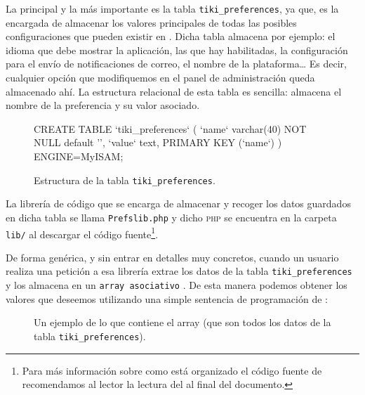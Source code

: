 La principal y la más importante es la tabla \texttt{tiki\_preferences}, ya que, es la encargada de almacenar los valores principales de todas las posibles configuraciones que pueden existir en \tiki{}. Dicha tabla almacena por ejemplo: el idioma que debe mostrar la aplicación, las  que hay habilitadas, la configuración para el envío de notificaciones de correo, el nombre de la plataforma\ldots{} Es decir, cualquier opción que modifiquemos en el panel de administración queda almacenado ahí.  
La estructura relacional de esta tabla es sencilla: almacena el nombre de la preferencia y su valor asociado.

\begin{figure}[h!]
\begin{pyglist}[language=sql]

  CREATE TABLE `tiki_preferences` (
    `name` varchar(40) NOT NULL default '',
    `value` text,
    PRIMARY KEY (`name`)
  ) ENGINE=MyISAM;
  
\end{pyglist}
\caption{Estructura de la tabla \texttt{tiki\_preferences}.}
\end{figure}
  
La librería de código que se encarga de almacenar y recoger los datos guardados en dicha tabla se llama \texttt{Prefslib.php} y dicho \textsc{php} se encuentra en la carpeta \texttt{lib/} al descargar el código fuente\footnote{Para más información sobre como está organizado el código fuente de \tiki{} recomendamos al lector la lectura del  al final del documento.}.

De forma genérica, y sin entrar en detalles muy concretos, cuando un usuario realiza una petición a \tiki{} esa librería extrae los datos de la tabla \texttt{tiki\_preferences} y los almacena en un \texttt{array asociativo} \cite{web:documentacion-php-arrays}. De esta manera podemos obtener los valores que deseemos utilizando una simple sentencia de programación de \php{}:

\begin{figure}[h!]
\caption{Un ejemplo de lo que contiene el array  (que son todos los datos de la tabla \texttt{tiki\_preferences}).}
\end{figure}

